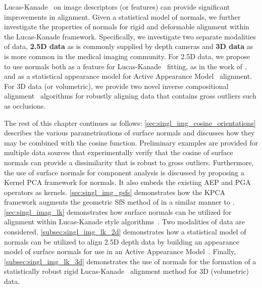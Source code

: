 Lucas-Kanade~\cite{lucas1981iterative} on image descriptors (or features) can
provide significant improvements in alignment. Given a statistical model
of normals, we further investigate the properties of normals for rigid and
deformable alignment within the Lucas-Kanade framework. Specifically, we
investigate two separate modalities of data, \textbf{2.5D data} as is
commonly supplied by depth cameras and \textbf{3D data} as is more common
in the medical imaging community. For 2.5D data, we propose to use normals both
as a feature for Lucas-Kanade~\cite{lucas1981iterative} fitting,
as in the work of \citet{antonakos2015feature}, and as a statistical
appearance model for Active Appearance Model~\cite{cootes2001active} alignment.
For 3D data (or volumetric), we provide two novel
inverse compositional alignment~\cite{baker2004lucas} algorithms for robustly
aligning data that contains gross outliers such as occlusions.

The rest of this chapter continues as follows:
\cref{sec:singl_img_cosine_orientations} describes the various
parametrisations of surface normals and discusses how they may be combined with
the cosine function. Preliminary examples are provided for multiple
data sources that experimentally verify that the cosine of surface normals
can provide a dissimilarity that is robust to gross outliers. Furthermore,
the use of surface normals for component analysis is discussed by proposing a
Kernel PCA framework for normals. It also embeds the existing AEP and PGA
operators as kernels.
\cref{sec:singl_img_gsfs} demonstrates how the KPCA framework augments
the geometric SfS method of \citet{worthington1999new} in a similar manner to
\citet{smith2006recovering}.
\cref{sec:singl_imag_lk} demonstrates how surface
normals can be utilized for alignment within Lucas-Kanade style
algorithms~\cite{lucas1981iterative}. Two modalities of data are considered,
\cref{subsec:singl_img_lk_2d} demonstrates how a statistical model of normals
can be utilized to align 2.5D depth data by building an appearance model of
surface normals for use in an Active Appearance Model~\cite{cootes2001active}.
Finally, \cref{subsec:singl_img_lk_3d} demonstrates the use of normals for the
formation of a statistically robust rigid Lucas-Kanade~\cite{lucas1981iterative}
alignment method for 3D (volumetric) data.
{





}
\stopcontents[chapters]
